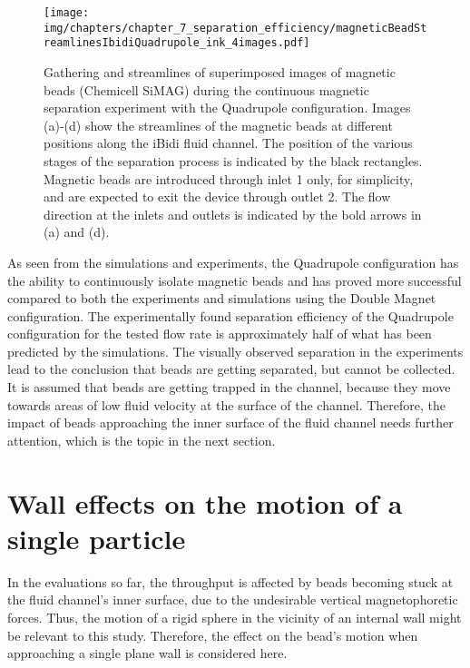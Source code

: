 \begin{figure}[htb]
   \centering
   \texttt{[image: img/chapters/chapter\_7\_separation\_efficiency/magneticBeadStreamlinesIbidiQuadrupole\_ink\_4images.pdf]}
   \caption[Magnetic separation experiment of the Quadrupole configuration in continuous flow]{Gathering and streamlines of superimposed images of magnetic beads (Chemicell SiMAG) during the continuous magnetic separation experiment with the Quadrupole configuration. Images (a)-(d) show the streamlines of the magnetic beads at different positions along the iBidi fluid channel. The position of the various stages of the separation process is indicated by the black rectangles. Magnetic beads are introduced through inlet 1 only, for simplicity, and are expected to exit the device through outlet 2. The flow direction at the inlets and outlets is indicated by the bold arrows in (a) and (d).}
   \label{fig:continuousMagneticSeparationExperimentQuadrupole}
\end{figure}


As seen from the simulations and experiments, the Quadrupole configuration has the ability to continuously isolate magnetic beads and has proved more successful compared to both the experiments and simulations using the Double Magnet configuration. The experimentally found separation efficiency of the Quadrupole configuration for the tested flow rate is approximately half of what has been predicted by the simulations. The visually observed separation in the experiments lead to the conclusion that beads are getting separated, but cannot be collected. It is assumed that beads are getting trapped in the channel, because they move towards areas of low fluid velocity at the surface of the channel. Therefore, the impact of beads approaching the inner surface of the fluid channel needs further attention, which is the topic in the next section.

\section{Wall effects on the motion of a single particle}
\label{sec:wallEffectsOnTheMotionOfASingleParticle}
In the evaluations so far, the throughput is affected by beads becoming stuck at the fluid channel's inner surface, due to the undesirable vertical magnetophoretic forces. Thus, the motion of a rigid sphere in the vicinity of an internal wall might be relevant to this study. Therefore, the effect on the bead's motion when approaching a single plane wall is considered here. 

